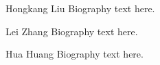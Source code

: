 \documentclass[journal]{IEEEtran}
\begin{document}
%
%
%


% 

\begin{IEEEbiography}{Hongkang Liu}
Biography text here.
\end{IEEEbiography}

\begin{IEEEbiographynophoto}{Lei Zhang}
Biography text here.
\end{IEEEbiographynophoto}


\begin{IEEEbiographynophoto}{Hua Huang}
Biography text here.
\end{IEEEbiographynophoto}
\end{document}
